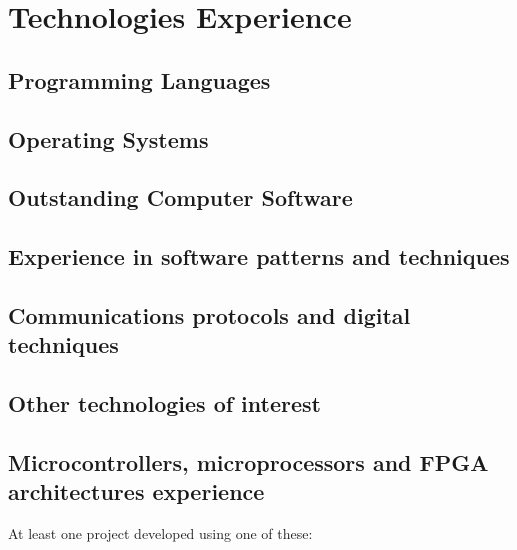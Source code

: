 
\section{Technologies Experience}
   \subsection{Programming Languages}
   \cvitem { \dicadvanced }{\proglangadvanced }
   \cvitem { \dicmedium   }{\proglangmedium }  
   \cvitem { \dicbasic    }{\proglangbasic}    

   \subsection{Operating Systems}
      \cvitem { \dicadvanced } { \osadvanced }
      \cvitem { \dicmedium   } { \osmedium   }
      \cvitem { \dicbasic    } { \osbasic    }
   \subsection{Outstanding Computer Software}
      \cvitem { \dicadvanced } { \computerprogadvanced }
      \cvitem { \dicmedium   } { \computerprogmedium   }
      \cvitem { \dicbasic    } { \computerprogbasic    }

   \subsection{Experience in software patterns and techniques}
      \cvitem { \dicadvanced } { \softtechadvanced }
      \cvitem { \dicmedium   } { \softtechmedium   }
      \cvitem { \dicbasic    } { \softtechbasic    }

   \subsection{Communications protocols and digital techniques}
      \cvitem{\dicadvanced }{ \protocoladvanced }
      \cvitem{\dicmedium   }{ \protocolmedium   }
      \cvitem{\dicbasic    }{ \protocolbasic    }

   \subsection{Other technologies of interest}
      \cvitem{\dicadvanced} { \othertechadvanced }
      \cvitem{\dicmedium  } { \othertechmedium   }
      \cvitem{\dicbasic   } { \othertechbasic    }



   \subsection{Microcontrollers, microprocessors and FPGA architectures experience}
      \cvitem {} { At least one project developed using one of these:}

